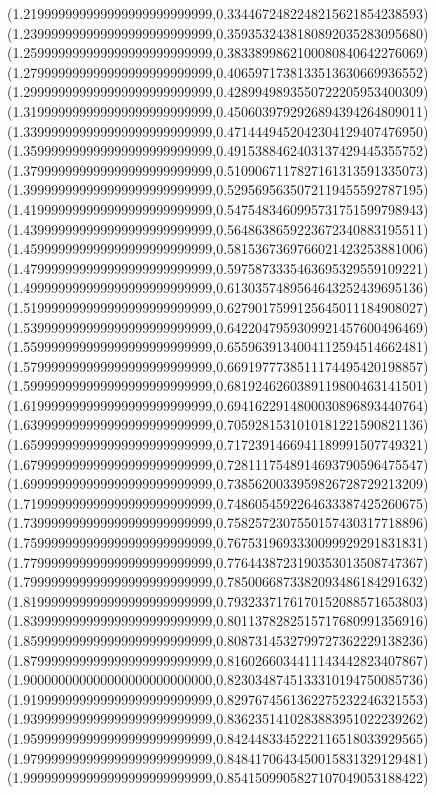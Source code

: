 \documentclass[11pt]{report}
\begin{document}
\begin{center}
  (1.219999999999999999999999999,0.3344672482248215621854238593)
  (1.239999999999999999999999999,0.3593532438180892035283095680)
  (1.259999999999999999999999999,0.3833899862100080840642276069)
  (1.279999999999999999999999999,0.4065971738133513630669936552)
  (1.299999999999999999999999999,0.4289949893550722205953400309)
  (1.319999999999999999999999999,0.4506039792926894394264809011)
  (1.339999999999999999999999999,0.4714449452042304129407476950)
  (1.359999999999999999999999999,0.4915388462403137429445355752)
  (1.379999999999999999999999999,0.5109067117827161313591335073)
  (1.399999999999999999999999999,0.5295695635072119455592787195)
  (1.419999999999999999999999999,0.5475483460995731751599798943)
  (1.439999999999999999999999999,0.5648638659223672340883195511)
  (1.459999999999999999999999999,0.5815367369766021423253881006)
  (1.479999999999999999999999999,0.5975873335463695329559109221)
  (1.499999999999999999999999999,0.6130357489564643252439695136)
  (1.519999999999999999999999999,0.6279017599125645011184908027)
  (1.539999999999999999999999999,0.6422047959309921457600496469)
  (1.559999999999999999999999999,0.6559639134004112594514662481)
  (1.579999999999999999999999999,0.6691977738511174495420198857)
  (1.599999999999999999999999999,0.6819246260389119800463141501)
  (1.619999999999999999999999999,0.6941622914800030896893440764)
  (1.639999999999999999999999999,0.7059281531010181221590821136)
  (1.659999999999999999999999999,0.7172391466941189991507749321)
  (1.679999999999999999999999999,0.7281117548914693790596475547)
  (1.699999999999999999999999999,0.7385620033959826728729213209)
  (1.719999999999999999999999999,0.7486054592264633387425260675)
  (1.739999999999999999999999999,0.7582572307550157430317718896)
  (1.759999999999999999999999999,0.7675319693330099929291831831)
  (1.779999999999999999999999999,0.7764438723190353013508747367)
  (1.799999999999999999999999999,0.7850066873382093486184291632)
  (1.819999999999999999999999999,0.7932337176170152088571653803)
  (1.839999999999999999999999999,0.8011378282515717680991356916)
  (1.859999999999999999999999999,0.8087314532799727362229138236)
  (1.879999999999999999999999999,0.8160266034411143442823407867)
  (1.900000000000000000000000000,0.8230348745133310194750085736)
  (1.919999999999999999999999999,0.8297674561362275232246321553)
  (1.939999999999999999999999999,0.8362351410283883951022239262)
  (1.959999999999999999999999999,0.8424483345222116518033929565)
  (1.979999999999999999999999999,0.8484170643450015831329129481)
  (1.999999999999999999999999999,0.8541509905827107049053188422)

\end{center}
\end{document}
